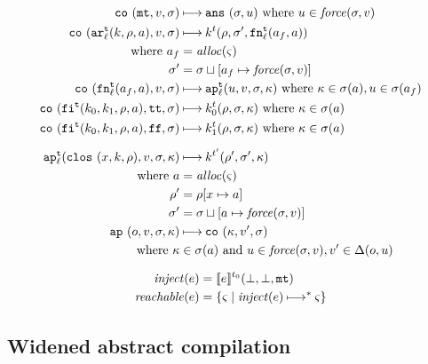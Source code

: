\documentclass{llncs}
\begin{document}
\begin{gather*}
\begin{align*}
\co{\kmt,\mval,\msto} &\machstep
\ans{\msto,\mvalx{u}}
\text{ where } \mvalx{u} \in \spchoice{\force(\msto,\mval)}{\force(\mval)}
\\
\co{\kar[^\mcntr_\mlab]{\mcomp,\menv,\maddr},\mval,\msto} & \machstep
\mcomp^\mcntr(\menv,\msto',\kfn[^\mcntr_\mlab]{\maddr_f,\maddr})
\\
\text{ where }\maddr_f &= \alloc(\mstate) \\
              \msto' &= \msto\sqcup[\maddr_f \mapsto \spchoice{\force(\msto,\mval)}{\force(\mval)}]
\\
\co{\kfn[^\mcntr_\mlab]{\maddr_f,\maddr},\mval,\msto} & \machstep
\ap[^\mcntr_\mlab]{\mvalx{u},\mval,\msto,\mkont}
\text{ where } \mkont \in \msto(\maddr), \mvalx{u} \in \msto(\maddr_f)
\\
\co{\kif[^\mcntr]{\mcompi0,\mcompi1,\menv,\maddr},\strue,\msto} & \machstep
\mcompi0^\mcntr(\menv,\msto,\mkont)
\text{ where }\mkont\in\msto(\maddr)
\\
\co{\kif[^\mcntr]{\mcompi0,\mcompi1,\menv,\maddr},\sfalse,\msto} & \machstep
\mcompi1^\mcntr(\menv,\msto,\mkont)
\text{ where }\mkont\in\msto(\maddr)
\\[2mm]
\ap[^\mcntr_\mlab]{\clos{\mvar,\mcomp,\menv},\mval,\msto,\mkont} & \machstep
\mcomp^{\mcntr'}(\menv',\msto',\mkont) \\
\text{ where }
\maddr &= \alloc(\mstate) \\
\menv' &= \menv[\mvar \mapsto \maddr] \\
\msto' &= \msto\sqcup[\maddr \mapsto \spchoice{\force(\msto, \mval)}{\force(\mval)}]
\\
\ap{\mop,\mval,\msto,\mkont} & \machstep
\co{\mkont,\mval',\msto} \\
\text{ where }\mkont &\in\msto(\maddr)
\text{ and } \mvalx{u} \in \spchoice{\force(\msto,\mval)}{\force(\mval)}, \mval'\in\interpdelta(\mop,\mvalx{u})
\end{align*}
\end{gather*}

\begin{align*}
\inject(\mexp) &= \compile{\mexp}^{\mtcntr}(\bot,\bot,\kmt) \\
\reachable{\mexp} &= \setof{\mstate \mid \inject(\mexp) \machstep^* \mstate}
\end{align*}

\subsection{Widened abstract compilation}
\end{document}
